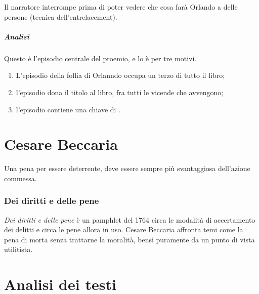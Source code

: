 \documentclass[a4paper]{article}
\begin{document}
Il narratore interrompe prima di poter vedere che cosa farà Orlando a delle persone
(tecnica dell'entrelacement).

\subsubsection{Analisi}

Questo è l'episodio centrale del proemio, e lo è per tre motivi.
\begin{enumerate}
    \item L'episodio della follia di Orlanndo occupa un terzo di tutto il libro;
    \item l'episodio dona il titolo al libro, fra tutti le vicende che avvengono;
    \item l'episodio contiene una chiave di .
\end{enumerate}



\pagebreak

\part{Cesare Beccaria}

Una pena per essere deterrente, deve essere sempre più svantaggiosa dell'azione commessa.


\section{Dei diritti e delle pene}

\textit{Dei diritti e delle pene} è un pamphlet del 1764 circa
le modalità di accertamento dei delitti e circa le pene allora in uso.
Cesare Beccaria affronta temi come la pena di morta senza trattarne la moralità, bensì puramente
da un punto di vista utilitista.

\pagebreak

\part{Analisi dei testi}

\end{document}
